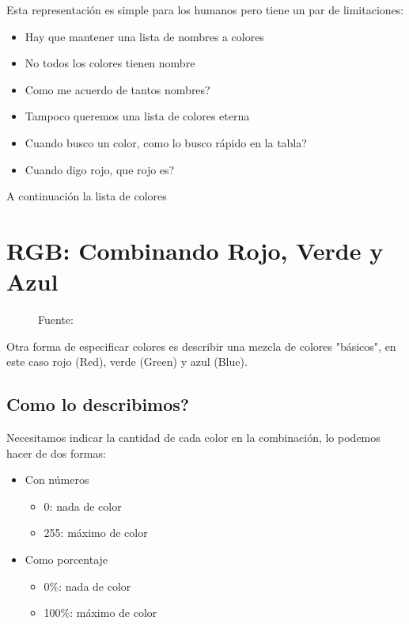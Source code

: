 \documentclass[letterpaper,10pt,spanish]{sphinxmanual}
\begin{document}
Esta representación es simple para los humanos pero tiene un par de limitaciones:
\begin{itemize}
\item {} 
Hay que mantener una lista de nombres a colores

\item {} 
No todos los colores tienen nombre

\item {} 
Como me acuerdo de tantos nombres?

\item {} 
Tampoco queremos una lista de colores eterna

\item {} 
Cuando busco un color, como lo busco rápido en la tabla?

\item {} 
Cuando digo rojo, que rojo es?

\end{itemize}

A continuación la lista de colores




\section{RGB: Combinando Rojo, Verde y Azul}
\label{\detokenize{colores:rgb-combinando-rojo-verde-y-azul}}
\begin{figure}[htbp]
\centering
\capstart

\noindent{}
\caption{Fuente: }\label{\detokenize{colores:id1}}\end{figure}

Otra forma de especificar colores es describir una mezcla de colores "básicos",
en este caso rojo (Red), verde (Green) y azul (Blue).


\subsection{Como lo describimos?}
\label{\detokenize{colores:como-lo-describimos}}
Necesitamos indicar la cantidad de cada color en la combinación, lo podemos
hacer de dos formas:
\begin{itemize}
\item {} 
Con números
\begin{itemize}
\item {} 
0: nada de color

\item {} 
255: máximo de color

\end{itemize}

\item {} 
Como porcentaje
\begin{itemize}
\item {} 
0\%: nada de color

\item {} 
100\%: máximo de color

\end{itemize}

\end{itemize}
\end{document}
